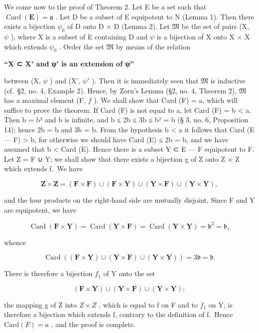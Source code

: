 We come now to the proof of Theorem 2. Let E be a set such that \(\operatorname{Card}(\mathbf{E}) = \mathfrak{a}\) . Let D be a subset of E equipotent to N (Lemma 1). Then there exists a bijection \(\psi_0\) of D onto D × D (Lemma 2). Let \(\mathfrak{M}\) be the set of pairs (X, \(\psi\) ), where X is a subset of E containing D and \(\psi\) is a bijection of X onto X × X which extends \(\psi_0\) . Order the set \(\mathfrak{M}\) by means of the relation

\textbf{``X ⊂ X' and ψ' is an extension of ψ''}

between (X, \(\psi\) ) and (X', \(\psi'\) ). Then it is immediately seen that \(\mathfrak{M}\) is inductive (cf.~§2, no. 4, Example 2). Hence, by Zorn's Lemma (§2, no. 4, Theorem 2), \(\mathfrak{M}\) has a maximal element (F, \(f\) ). We shall show that Card (F) = a, which will suffice to prove the theorem. If Card (F) is not equal to a, let Card (F) = b \textless{} a. Then b = b² and b is infinite, and b ≤ 2b ≤ 3b ≤ b² = b (§ 3, no. 6, Proposition 14); hence 2b = b and 3b = b. From the hypothesis b \textless{} a it follows that Card (E --- F) \textgreater{} b, for otherwise we should have Card (E) ≤ 2b = b, and we have assumed that b \textless{} Card (E). Hence there is a subset Y ⊂ E --- F equipotent to F. Let Z = F ∪ Y; we shall show that there exists a bijection g of Z onto Z × Z which extends f.~We have

\[
\mathbf {Z} \times \mathbf {Z} = (\mathbf {F} \times \mathbf {F}) \cup (\mathbf {F} \times \mathbf {Y}) \cup (\mathbf {Y} \times \mathbf {F}) \cup (\mathbf {Y} \times \mathbf {Y}),
\]

and the four products on the right-hand side are mutually disjoint. Since F and Y are equipotent, we have

\[
\operatorname{Card} (\mathbf {F} \times \mathbf {Y}) = \operatorname{Card} (\mathbf {Y} \times \mathbf {F}) = \operatorname{Card} (\mathbf {Y} \times \mathbf {Y}) = \mathfrak {b} ^ {2} = \mathfrak {b},
\]

whence

\[
\operatorname{Card} ((\mathbf {F} \times \mathbf {Y}) \cup (\mathbf {Y} \times \mathbf {F}) \cup (\mathbf {Y} \times \mathbf {Y})) = 3 \mathfrak {b} = \mathfrak {b}.
\]

There is therefore a bijection \(f_{1}\) of Y onto the set

\[
(\mathbf {F} \times \mathbf {Y}) \cup (\mathbf {Y} \times \mathbf {F}) \cup (\mathbf {Y} \times \mathbf {Y});
\]

the mapping g of Z into \(Z \times Z\) , which is equal to f on F and to \(f_{1}\) on Y, is therefore a bijection which extends f, contrary to the definition of f.~Hence \(\text{Card}(F) = a\) , and the proof is complete.

